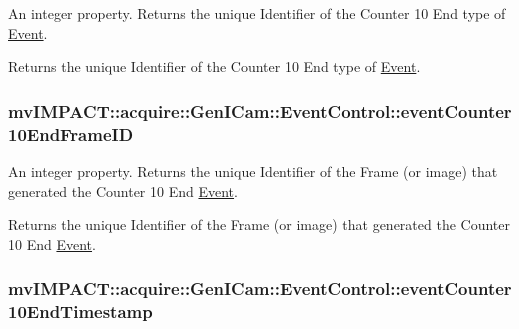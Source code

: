 An integer property. Returns the unique Identifier of the Counter 10 End type of \hyperlink{classmv_i_m_p_a_c_t_1_1acquire_1_1_event}{Event}. 

Returns the unique Identifier of the Counter 10 End type of \hyperlink{classmv_i_m_p_a_c_t_1_1acquire_1_1_event}{Event}. \hypertarget{classmv_i_m_p_a_c_t_1_1acquire_1_1_gen_i_cam_1_1_event_control_ac9004ca6e15411020397283f2038eef4}{
\subsubsection[{event\+Counter10\+End\+Frame\+I\+D}]{ mv\+I\+M\+P\+A\+C\+T\+::acquire\+::\+Gen\+I\+Cam\+::\+Event\+Control\+::event\+Counter10\+End\+Frame\+I\+D}}\label{classmv_i_m_p_a_c_t_1_1acquire_1_1_gen_i_cam_1_1_event_control_ac9004ca6e15411020397283f2038eef4}


An integer property. Returns the unique Identifier of the Frame (or image) that generated the Counter 10 End \hyperlink{classmv_i_m_p_a_c_t_1_1acquire_1_1_event}{Event}. 

Returns the unique Identifier of the Frame (or image) that generated the Counter 10 End \hyperlink{classmv_i_m_p_a_c_t_1_1acquire_1_1_event}{Event}. \hypertarget{classmv_i_m_p_a_c_t_1_1acquire_1_1_gen_i_cam_1_1_event_control_a2fa2709fea9440e5abe33ea31b262148}{
\subsubsection[{event\+Counter10\+End\+Timestamp}]{ mv\+I\+M\+P\+A\+C\+T\+::acquire\+::\+Gen\+I\+Cam\+::\+Event\+Control\+::event\+Counter10\+End\+Timestamp}}\label{classmv_i_m_p_a_c_t_1_1acquire_1_1_gen_i_cam_1_1_event_control_a2fa2709fea9440e5abe33ea31b262148}


